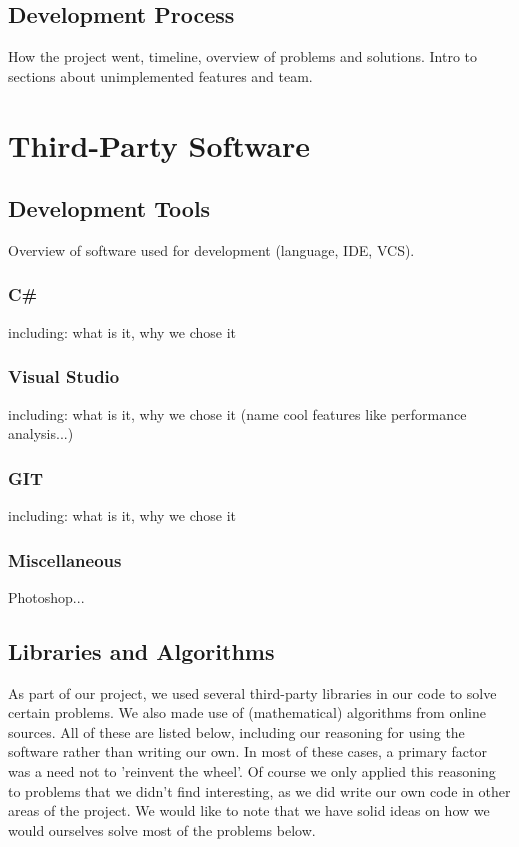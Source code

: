 \documentclass[10pt,twocolumn]{scrartcl}
\begin{document}
\subsection{Development Process}
How the project went, timeline, overview of problems and solutions. Intro to sections about unimplemented features and team.

\section{Third-Party Software}

\subsection{Development Tools}
Overview of software used for development (language, IDE, VCS).

\subsubsection{C\#}
including: what is it, why we chose it

\subsubsection{Visual Studio}
including: what is it, why we chose it (name cool features like performance analysis...)

\subsubsection{GIT}
including: what is it, why we chose it

\subsubsection{Miscellaneous}
Photoshop...

\subsection{Libraries and Algorithms}
As part of our project, we used several third-party libraries in our code to solve certain problems. We also made use of (mathematical) algorithms from online sources. All of these are listed below, including our reasoning for using the software rather than writing our own. In most of these cases, a primary factor was a need not to 'reinvent the wheel'. Of course we only applied this reasoning to problems that we didn't find interesting, as we did write our own code in other areas of the project. We would like to note that we have solid ideas on how we would ourselves solve most of the problems below.
\end{document}
